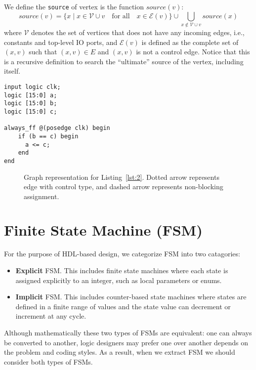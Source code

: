 \documentclass{article}
\begin{document}
We define the \texttt{source} of vertex is the function $source(v)$:
\[
    source(v) = \{x \mid x \in \mathcal{V} \cup {v}\quad\text{for all}\quad x \in \mathcal{E}(v) \} \cup \bigcup_{x \not \in \mathcal{V} \cup {v}}
                source(x)
\]
where $\mathcal{V}$ denotes the set of vertices that does not have any incoming edges,
i.e., constants and top-level IO ports, and $\mathcal{E}(v)$ is defined as the complete
set of $(x, v)$ such that $(x, v) \in E$ and $(x, v)$ is not a control edge.
Notice that this is a recursive definition to search the ``ultimate'' source of the
vertex, including itself.

\begin{lstlisting}[style={verilog-style}, caption={Control vertex and non-blocking
    assignment Verilog code},
    label={lst:2}]
input logic clk;
logic [15:0] a;
logic [15:0] b;
logic [15:0] c;

always_ff @(posedge clk) begin
    if (b == c) begin
      a <= c;
    end
end
\end{lstlisting}

\begin{figure}
    \centering
    \begin{tikzpicture}
    
    \end{tikzpicture}
    \caption{Graph representation for Listing~\ref{lst:2}. Dotted arrow represents edge with control
    type, and dashed arrow represents non-blocking assignment.}
    \label{fig:2}
\end{figure}

\section{Finite State Machine (FSM)}\label{sec:fsm}
For the purpose of HDL-based design, we categorize FSM into two catagories:
\begin{itemize}
    \item \textbf{Explicit} FSM. This includes finite state machines where each state
    is assigned explicitly to an integer, such as local parameters or enums.
    \item \textbf{Implicit} FSM. This includes counter-based state machines where
    states are defined in a finite range of values and the state value can decrement
    or increment at any cycle.
\end{itemize}
Although mathematically these two types of FSMs are equivalent: one can always be
converted to another, logic designers may prefer one over another depends on the
problem and coding styles. As a result, when we extract FSM we should consider both
types of FSMs.
\end{document}
